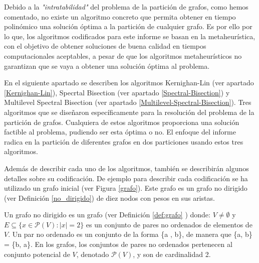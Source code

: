 Debido a la \textit{"intratabilidad"} del problema de la partición de grafos, como hemos comentado, no existe un algoritmo concreto que permita obtener en tiempo polinómico una solución óptima a la partición de cualquier grafo. Es por ello por lo que, los algoritmos codificados para este informe se basan en la metaheurística, con el objetivo de obtener soluciones de buena calidad en tiempos computacionales aceptables, a pesar de que los algoritmos metaheurísticos no garantizan que se vaya a obtener una solución óptima al problema.

En el siguiente apartado se describen los algoritmos Kernighan-Lin\cite{KernighanLin} (ver apartado \ref{Kernighan-Lin}), Specrtal Bisection (ver apartado \ref{Spectral-Bisection}) y Multilevel Spectral Bisection (ver apartado \ref{Multilevel-Spectral-Bisection}). Tres algoritmos que se diseñaron específicamente para la resolución del problema de la partición de grafos. Cualquiera de estos algoritmos proporciona una solución factible al problema, pudiendo ser esta óptima o no. El enfoque del informe radica en la partición de diferentes grafos en dos particiones usando estos tres algoritmos. 

Además de describir cada uno de los algoritmos, también se describirán algunos detalles sobre su codificación.
De ejemplo para describir cada codificación se ha utilizado un grafo inicial (ver Figura \ref{grafo}). Este grafo es un grafo no dirigido (ver Definición \ref{no_dirigido}) de diez nodos con pesos en sus aristas.

\begin{mydef}\label{no_dirigido}
	Un grafo no dirigido es un grafo (ver Definición \ref{def:grafo} ) donde: $V\neq \emptyset$ y $E\subseteq \{x\in \mathcal P(V):|x|=2\}$ es un conjunto de pares no ordenados de elementos de $V$. Un par no ordenado es un conjunto de la forma \{a , b\}, de manera que \{a, b\} = \{b, a\}. En los grafos, los conjuntos de pares no ordenados pertenecen al conjunto potencial de $V$, denotado $\mathcal P(V)$, y son de cardinalidad 2. 
\end{mydef}

